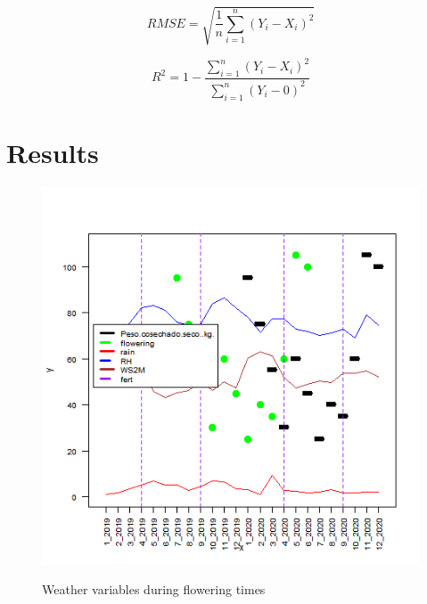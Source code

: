 \documentclass[gene,journal,article,submit,moreauthors,pdftex]{Definitions/mdpi}
\begin{document}
\begin{equation}
RMSE= \sqrt{\frac{1}{n}  \sum_{i=1}^{n} (Y_{i}-X_{i})^{2} } 
\label{equ:RMSE}
\end{equation}

\begin{equation}
R^{2}= 1- \frac{\sum_{i=1}^{n} (Y_{i}-X_{i})^{2}}{{\sum_{i=1}^{n}(Y_{i}-0)}^{2}}
\label{equ:R2}
\end{equation}

\section{Results}
\begin{figure}[h]
	\centering
	\caption{\footnotesize {Weather variables during flowering times}} 
	\includegraphics[scale=0.4]{images/averageS.png}\\
	\label{fig:weather}
\end{figure}
\end{document}
